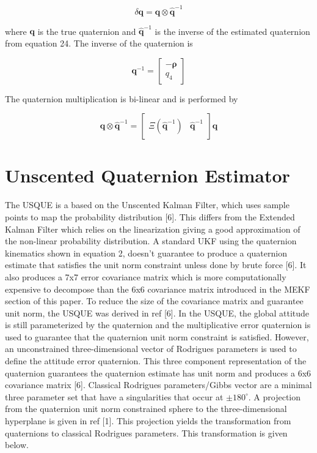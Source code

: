 \documentclass[12pt]{report}
\begin{document}
\begin{equation}
	\delta\pmb{q} = \pmb{q} \otimes \hat{\pmb{q}}^{-1}
\end{equation}  

\noindent where $\pmb{q}$ is the true quaternion and $\pmb{\hat{q}}^{-1}$ is the inverse of the estimated quaternion from equation 24. The inverse of the quaternion is 

\begin{equation}
\pmb{q}^{-1} = \begin{bmatrix}
	-\pmb{\rho} \\
	 q_4
	 \end{bmatrix}
\end{equation}  

\noindent The quaternion multiplication is bi-linear and is performed by

\begin{equation}
 \pmb{q} \otimes \hat{\pmb{q}}^{-1} = \begin{bmatrix}
 	\Xi(\hat{\pmb{q}}^{-1}) & \hat{\pmb{q}}^{-1}
 \end{bmatrix}\pmb{q}
\end{equation}  

\section*{Unscented Quaternion Estimator}
\noindent The USQUE is a based on the Unscented Kalman Filter, which uses sample points to map the probability distribution [6]. This differs from the Extended Kalman Filter which relies on the linearization giving a good approximation of the non-linear probability distribution. A standard UKF using the quaternion kinematics shown in equation 2, doesn't guarantee to produce a quaternion estimate that satisfies the unit norm constraint unless done by brute force [6]. It also produces a 7x7 error covariance matrix which is more computationally expensive to decompose than the 6x6 covariance matrix introduced in the MEKF section of this paper. To reduce the size of the covariance matrix and guarantee unit norm, the USQUE was derived in ref [6]. In the USQUE, the global attitude is still parameterized by the quaternion and the multiplicative error quaternion is used to guarantee that the quaternion unit norm constraint is satisfied. However, an unconstrained three-dimensional vector of Rodrigues parameters is used to define the attitude error quaternion. This three component representation of the quaternion guarantees the quaternion estimate has unit norm and produces a 6x6 covariance matrix [6]. Classical Rodrigues parameters/Gibbs vector are a minimal three parameter set that have a singularities that occur at $\pm 180^\circ$. A projection from the quaternion unit norm constrained sphere to the three-dimensional hyperplane is given in ref [1]. This projection yields the transformation from quaternions to classical Rodrigues parameters. This transformation is given below.
\end{document}
